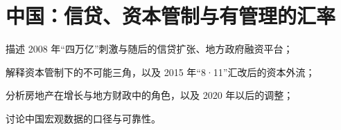 \chapter{中国：信贷、资本管制与有管理的汇率}\label{ch:chinacredit}

\begin{chapterguide}
\begin{guidegoals}
\item 描述 2008 年“四万亿”刺激与随后的信贷扩张、地方政府融资平台；
\item 解释资本管制下的不可能三角，以及 2015 年“8·11”汇改后的资本外流；
\item 分析房地产在增长与地方财政中的角色，以及 2020 年以后的调整；
\item 讨论中国宏观数据的口径与可靠性。
\end{guidegoals}
\end{chapterguide}

\chapterstub
